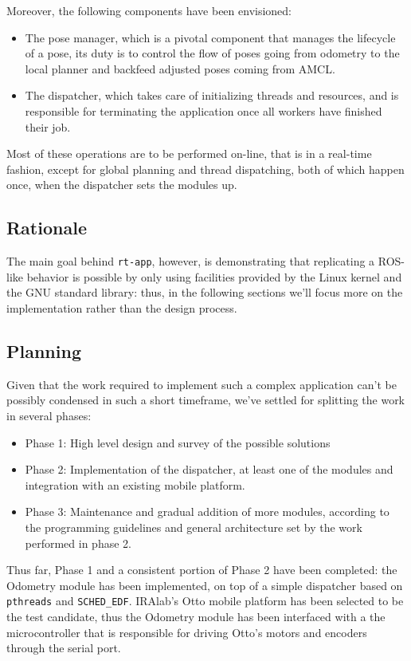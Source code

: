\documentclass[a4paper,12pt]{report}
\begin{document}
Moreover, the following components have been envisioned:
\begin{itemize}
  \item The pose manager, which is a pivotal component that manages the lifecycle of a pose, its duty is to control the flow of poses going from odometry to the local planner and backfeed adjusted poses coming from AMCL.
  \item The dispatcher, which takes care of initializing threads and resources, and is responsible for terminating the application once all workers have finished their job.
\end{itemize}

Most of these operations are to be performed on-line, that is in a real-time fashion, except for global planning and thread dispatching, both of which happen once, when the dispatcher sets the modules up.

\subsection{Rationale}

The main goal behind \texttt{rt-app}, however, is demonstrating that replicating a ROS-like behavior is possible by only using facilities provided by the Linux kernel and the GNU standard library: thus, in the following sections we'll focus more on the implementation rather than the design process.

\subsection{Planning}

Given that the work required to implement such a complex application can't be possibly condensed in such a short timeframe, we've settled for splitting the work in several phases:
\begin{itemize}
  \item Phase 1: High level design and survey of the possible solutions
  \item Phase 2: Implementation of the dispatcher, at least one of the modules and integration with an existing mobile platform.
  \item Phase 3: Maintenance and gradual addition of more modules, according to the programming guidelines and general architecture set by the work performed in phase 2.
\end{itemize}

Thus far, Phase 1 and a consistent portion of Phase 2 have been completed: the Odometry module has been implemented, on top of a simple dispatcher based on \texttt{pthreads} and \texttt{SCHED\_EDF}. IRAlab's Otto\cite{fdila-bs-otto} mobile platform has been selected to be the test candidate, thus the Odometry module has been interfaced with a the microcontroller that is responsible for driving Otto's motors and encoders through the serial port.
\end{document}
